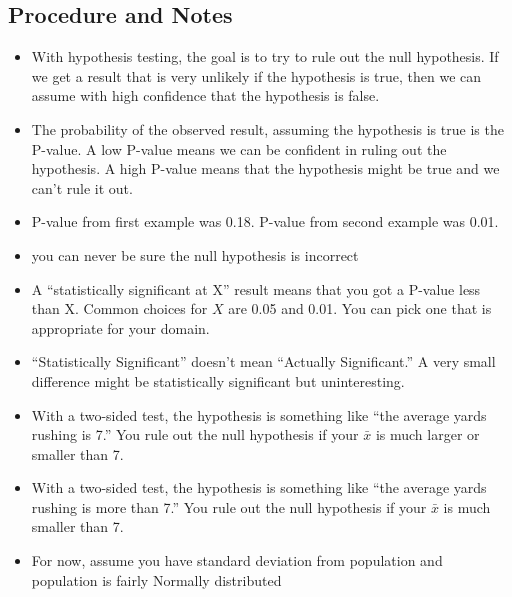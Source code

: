 \documentclass[landscape]{exam}
\begin{document}
  \subsection{Procedure and Notes}
  \begin{itemize}
    \item With hypothesis testing, the goal is to try to rule out the null
      hypothesis. If we get a result that is very unlikely if the hypothesis is
      true, then we can assume with high confidence that the hypothesis is
      false.

    \item The probability of the observed result, assuming the hypothesis is
      true is the P-value. A low P-value means we can be confident in ruling out
      the hypothesis. A high P-value means that the hypothesis might be true and
      we can't rule it out.

    \item P-value from first example was 0.18. P-value from second example was
      0.01.

    \item you can never be sure the null hypothesis is incorrect

    \item A ``statistically significant at X'' result means that you got a P-value
      less than X. Common choices for $X$ are 0.05 and 0.01. You can pick one
      that is appropriate for your domain.

    \item ``Statistically Significant'' doesn't mean ``Actually Significant.'' A
      very small difference might be statistically significant but
      uninteresting.

    \item With a two-sided test, the hypothesis is something like ``the average
      yards rushing is 7.'' You rule out the null hypothesis if your $\bar{x}$
      is much larger or smaller than 7.

    \item With a two-sided test, the hypothesis is something like ``the average
      yards rushing is more than 7.'' You rule out the null hypothesis if your $\bar{x}$
      is much smaller than 7.

    \item For now, assume you have standard deviation from population and
      population is fairly Normally distributed

  \end{itemize}
\end{document}
